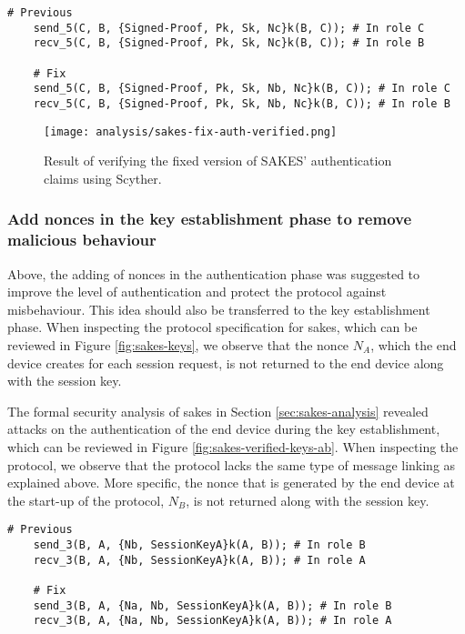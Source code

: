 \begin{lstlisting}[caption={Fix to the SAKES protocol to provide non-injective synchronization and data agreement for the router $B$ during the authentication phase.}, label={lst:fix-nisynch-b-auth}]
	# Previous
	send_5(C, B, {Signed-Proof, Pk, Sk, Nc}k(B, C)); # In role C
	recv_5(C, B, {Signed-Proof, Pk, Sk, Nc}k(B, C)); # In role B
	
	# Fix
	send_5(C, B, {Signed-Proof, Pk, Sk, Nb, Nc}k(B, C)); # In role C
	recv_5(C, B, {Signed-Proof, Pk, Sk, Nb, Nc}k(B, C)); # In role B
\end{lstlisting}
\newpage

\begin{figure}[H]
	\centering
	\texttt{[image: analysis/sakes-fix-auth-verified.png]}
	\caption{Result of verifying the fixed version of SAKES' authentication claims using Scyther.}
	\label{fig:sakes-fix-verified-auth}
\end{figure}

\subsubsection{Add nonces in the key establishment phase to remove malicious behaviour}

Above, the adding of nonces in the authentication phase was suggested to improve the level of authentication and protect the protocol against misbehaviour. This idea should also be transferred to the key establishment phase. When inspecting the protocol specification for \gls{sakes}, which can be reviewed in Figure \ref{fig:sakes-keys}, we observe that the nonce $N_A$, which the end device creates for each session request, is not returned to the end device along with the session key.

The formal security analysis of \gls{sakes} in Section \ref{sec:sakes-analysis} revealed attacks on the authentication of the end device during the key establishment, which can be reviewed in Figure \ref{fig:sakes-verified-keys-ab}. When inspecting the protocol, we observe that the protocol lacks the same type of message linking as explained above. More specific, the nonce that is generated by the end device at the start-up of the protocol, $N_B$, is not returned along with the session key.


\begin{lstlisting}[caption={Fix to the SAKES protocol to provide non-injective synchronization and data agreement for the end device $A$ during the key distribution.}, label={lst:fix-nisynch-a-keys}]
	# Previous
	send_3(B, A, {Nb, SessionKeyA}k(A, B)); # In role B
	recv_3(B, A, {Nb, SessionKeyA}k(A, B)); # In role A
	
	# Fix
	send_3(B, A, {Na, Nb, SessionKeyA}k(A, B)); # In role B
	recv_3(B, A, {Na, Nb, SessionKeyA}k(A, B)); # In role A
\end{lstlisting}

